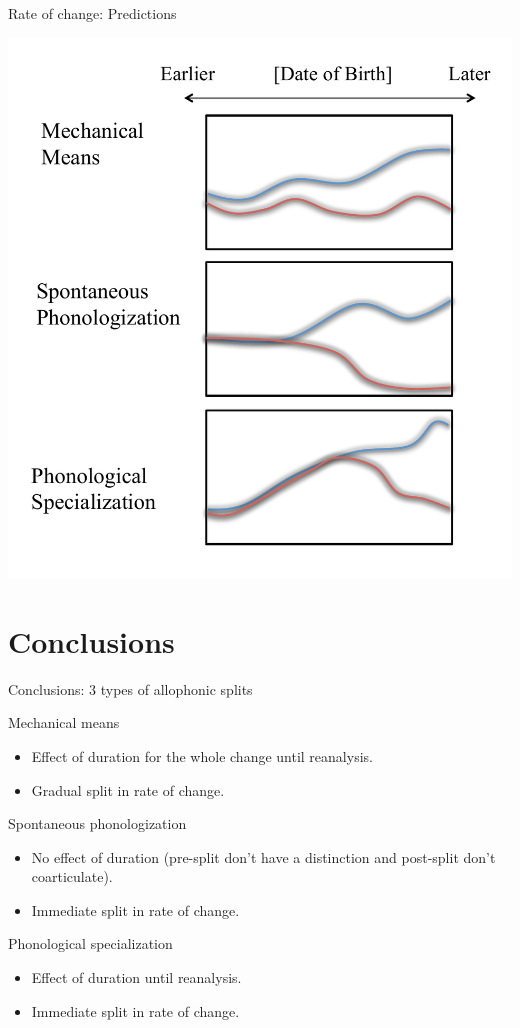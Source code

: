\documentclass[hyperref={pdfpagelabels=false}]{beamer}
\begin{document}
\begin{frame}{Rate of change: Predictions}
	\begin{center}
	\includegraphics[width=.65\textwidth]{rocpred.pdf}
	\end{center}
\end{frame}


\section{Conclusions}

\begin{frame}{Conclusions: 3 types of allophonic splits}
	\begin{block}{Mechanical means}
		\begin{itemize}
			\item Effect of duration for the whole change until reanalysis.
			\item Gradual split in rate of change. \pause
		\end{itemize}
	\end{block}
	
	\begin{block}{Spontaneous phonologization}
		\begin{itemize}
			\item No effect of duration (pre-split don't have a distinction and post-split don't coarticulate).
			\item Immediate split in rate of change. \pause
		\end{itemize}
	\end{block}
	
	\begin{block}{Phonological specialization}
		\begin{itemize}
			\item Effect of duration until reanalysis.
			\item Immediate split in rate of change.
		\end{itemize}
	\end{block}
\end{frame}
\end{document}
